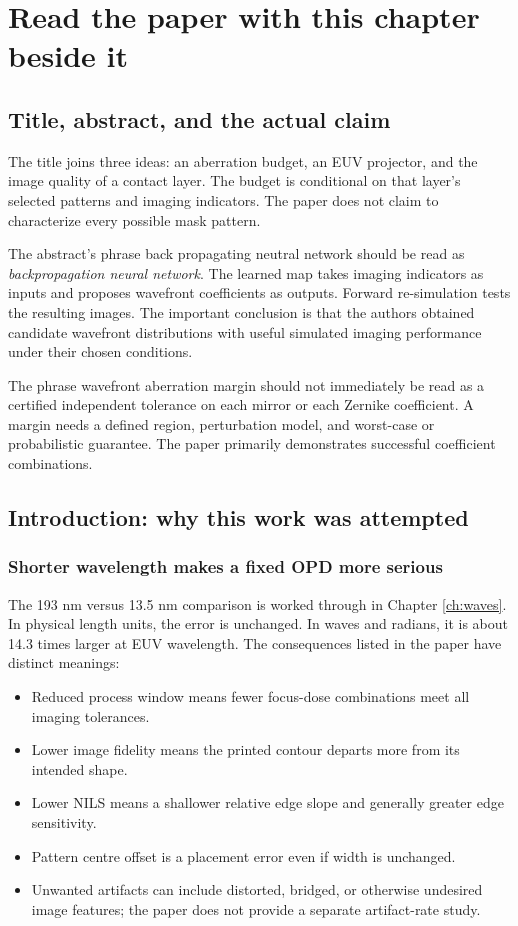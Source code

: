 \chapter{Read the paper with this chapter beside it}\label{ch:walkthrough}
\section{Title, abstract, and the actual claim}
The title joins three ideas: an aberration budget, an EUV projector, and
the image quality of a contact layer. The budget is conditional on that
layer's selected patterns and imaging indicators. The paper does not
claim to characterize every possible mask pattern.

The abstract's phrase back propagating neutral network should be read as
\emph{backpropagation neural network}. The learned map takes imaging
indicators as inputs and proposes wavefront coefficients as outputs.
Forward re-simulation tests the resulting images.
The important conclusion is that the authors obtained candidate
wavefront distributions with useful simulated imaging performance under
their chosen conditions.

The phrase wavefront aberration margin should not immediately be read
as a certified independent tolerance on each mirror or each Zernike
coefficient. A margin needs a defined region, perturbation model, and
worst-case or probabilistic guarantee. The paper primarily demonstrates
successful coefficient combinations.

\section{Introduction: why this work was attempted}
\subsection{Shorter wavelength makes a fixed OPD more serious}
The 193 nm versus 13.5 nm comparison is worked through in
Chapter \ref{ch:waves}. In physical length units, the error is unchanged.
In waves and radians, it is about 14.3 times larger at EUV wavelength.
The consequences listed in the paper have distinct meanings:
\begin{itemize}
\item Reduced process window means fewer focus-dose combinations meet
all imaging tolerances.
\item Lower image fidelity means the printed contour departs more
from its intended shape.
\item Lower NILS means a shallower relative edge slope and generally
greater edge sensitivity.
\item Pattern centre offset is a placement error even if width is unchanged.
\item Unwanted artifacts can include distorted, bridged, or otherwise
undesired image features; the paper does not provide a separate
artifact-rate study.
\end{itemize}

